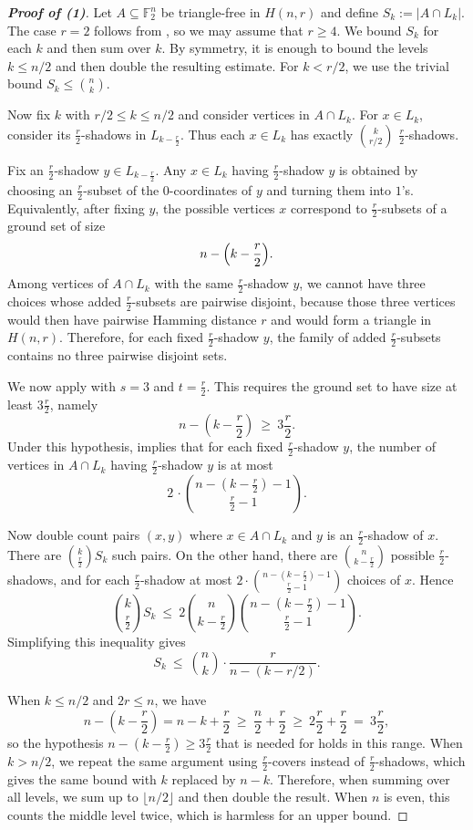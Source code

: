 \documentclass[11pt]{article}
\theoremstyle{plain}
\newcommand{\F}{\mathbb{F}}
\begin{document}
\begin{proof}[\textbf{Proof of (1)}]

Let $A\subseteq \F_2^n$ be triangle-free in $H(n,r)$ and define
$S_k:=|A\cap L_k|$.
The case $r=2$ follows from , so we may assume that
$r\ge4$.
We bound $S_k$ for each $k$ and then sum over $k$.
By symmetry, it is enough to bound the levels $k\le n/2$ and
then double the resulting estimate.
For $k<r/2$, we use the trivial bound $S_k\le \binom nk$.

Now fix $k$ with $r/2\le k\le n/2$ and consider vertices in $A\cap L_k$.
For $x\in L_k$, consider its $\frac r2$-shadows in $L_{k-\frac r2}$.
Thus each $x\in L_k$ has exactly $\binom{k}{r/2}$ 
$\frac r2$-shadows.

Fix an $\frac r2$-shadow $y\in L_{k-\frac r2}$.
Any $x\in L_k$ having $\frac r2$-shadow $y$ is obtained by choosing an $\frac r2$-subset of the $0$-coordinates of $y$
and turning them into $1$'s.
Equivalently, after fixing $y$, the possible vertices $x$ correspond to $\frac r2$-subsets of a ground set of size
\[
n-\Bigl(k-\frac r2\Bigr).
\]
Among vertices of $A\cap L_k$ with the same $\frac r2$-shadow $y$, we cannot have three choices whose added $\frac r2$-subsets are pairwise disjoint, because those three vertices would then have pairwise Hamming distance $r$ and would form a triangle in $H(n,r)$.
Therefore, for each fixed $\frac r2$-shadow $y$, the family of added $\frac r2$-subsets contains no three pairwise disjoint sets.

We now apply  with $s=3$ and $t=\frac r2$.
This requires the ground set to have size at least $3\frac r2$, namely
\[
n-(k-\frac r2)\ \ge\ 3\frac r2.
\]
Under this hypothesis,  implies that for each fixed $\frac r2$-shadow $y$,
the number of vertices in $A\cap L_k$ having $\frac r2$-shadow $y$ is at most
\[
2\,\cdot\binom{n-(k-\frac r2)-1}{\frac r2-1}.
\]

Now double count pairs $(x,y)$ where $x\in A\cap L_k$ and $y$ is an $\frac r2$-shadow of $x$.
There are $\binom{k}{\frac r2}S_k$ such pairs.
On the other hand, there are $\binom{n}{k-\frac r2}$ possible $\frac r2$-shadows, and for each $\frac r2$-shadow at most
$2\cdot \binom{n-(k-\frac r2)-1}{\frac r2-1}$ choices of $x$.
Hence
\[
\binom{k}{\frac r2}S_k
\ \le\
2\binom{n}{k-\frac r2}\binom{n-(k-\frac r2)-1}{\frac r2-1}.
\]
Simplifying this inequality gives
\[
S_k\ \le\  \binom{n}{k}\cdot \frac{r}{n-(k-r/2)}.
\]

When $k\le n/2$ and $2r\le n$, we have
\[
n-(k-\frac r2)=n-k+\frac r2\ \ge\ \frac{n}{2}+\frac r2\ \ge\ 2\frac r2+\frac r2\ =\ 3\frac r2,
\]
so the hypothesis $n-(k-\frac r2)\ge 3\frac r2$ that is needed for  holds in this range.
When $k>n/2$, we repeat the same argument using $\frac r2$-covers instead of $\frac r2$-shadows, which gives the same
bound with $k$ replaced by $n-k$.
Therefore, when summing over all levels, we sum up to $\lfloor n/2 \rfloor$ and then double the result. When $n$ is even, this counts the middle level twice, which is harmless for an upper bound.


\end{proof}
\end{document}
